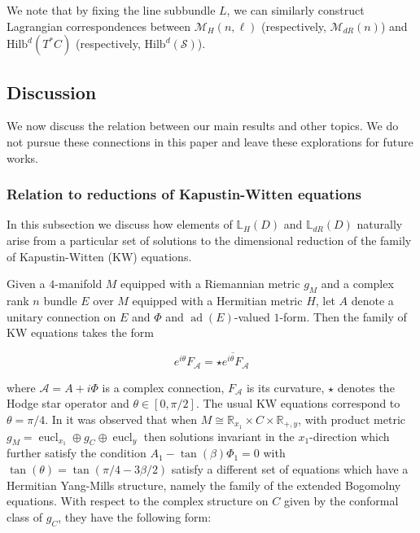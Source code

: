 \documentclass[twoside, 11pt]{article}
\numberwithin{equation}{section}
\theoremstyle{theorem}
\numberwithin{theorem}{section}
\theoremstyle{definition}
\DeclareMathOperator{\ad}{ad}
\DeclareMathOperator{\eucl}{eucl}
\begin{document}
We note that by fixing the line subbundle $L$, we can similarly construct Lagrangian correspondences between $\mathcal{M}_H(n, \ell)$ (respectively, $\mathcal{M}_{dR}(n)$) and $\mathrm{Hilb}^d(T^\ast C)$ (respectively, $\mathrm{Hilb}^d(\mathcal{S})$).


\subsection{Discussion}
\label{sect-intro-discussion}
We now discuss the relation between our main results and other topics. We do not pursue these connections in this paper and leave these explorations for future works.  

\subsubsection{Relation to reductions of Kapustin-Witten equations}
In this subsection we discuss how elements of $\mathbb L_H(D)$ and $\mathbb L_{dR}(D)$ naturally arise from a particular set of solutions to the dimensional reduction of the family of Kapustin-Witten (KW) equations. 

Given a $4$-manifold $M$ equipped with a Riemannian metric $g_M$ and a complex rank $n$ bundle $E$ over $M$ equipped with a Hermitian metric $H$, let $A$ denote a unitary connection on $E$ and $\Phi$ and $\ad(E)$-valued $1$-form. Then the family of KW equations takes the form 

\begin{equation}
e^{i\theta}F_{\mathcal A} = \overline{\star e^{i\theta}F_{\mathcal A}}
\end{equation}

where $\mathcal A = A+i\Phi$ is a complex connection, $F_{\mathcal A}$ is its curvature, $\star$ denotes the Hodge star operator and $\theta\in [0,\pi/2]$. The usual KW equations correspond to $\theta = \pi/4$. In \cite{Kapustin-Witten06, GW11} it was observed that when $M \cong \mathbb R_{x_1}\times C\times \mathbb R_{+,y}$, with product metric $g_M = \eucl_{x_1}\oplus g_C\oplus \eucl_{y}$ then solutions invariant in the $x_1$-direction which further satisfy the condition $A_1-\tan(\beta)\Phi_1 = 0$ with $\tan(\theta) = \tan(\pi/4-3\beta/2)$ satisfy a different set of equations which have a Hermitian Yang-Mills structure, namely the family of the extended Bogomolny equations. With respect to the complex structure on $C$ given by the conformal class of $g_C$, they have the following form:
\end{document}

